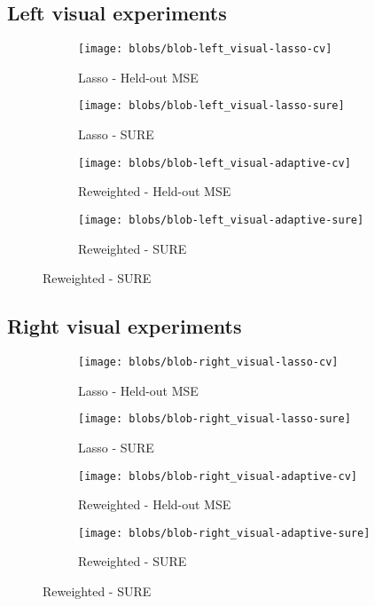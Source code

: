 \subsection{Left visual experiments}

\begin{figure}
    \centering
    \begin{subfigure}{6cm}
        \centering \texttt{[image: blobs/blob-left\_visual-lasso-cv]}
        \caption{Lasso - Held-out MSE}
    \end{subfigure}
    \begin{subfigure}{6cm}
        \centering \texttt{[image: blobs/blob-left\_visual-lasso-sure]}
        \caption{Lasso - SURE}
    \end{subfigure}

    \begin{subfigure}{6cm}
        \centering \texttt{[image: blobs/blob-left\_visual-adaptive-cv]}
        \caption{Reweighted - Held-out MSE}
    \end{subfigure}
    \begin{subfigure}{6cm}
        \centering \texttt{[image: blobs/blob-left\_visual-adaptive-sure]}
        \caption{Reweighted - SURE}
    \end{subfigure}
\end{figure}


\subsection{Right visual experiments}

\begin{figure}
    \centering
    \begin{subfigure}{6cm}
        \centering \texttt{[image: blobs/blob-right\_visual-lasso-cv]}
        \caption{Lasso - Held-out MSE}
    \end{subfigure}
    \begin{subfigure}{6cm}
        \centering \texttt{[image: blobs/blob-right\_visual-lasso-sure]}
        \caption{Lasso - SURE}
    \end{subfigure}

    \begin{subfigure}{6cm}
        \centering \texttt{[image: blobs/blob-right\_visual-adaptive-cv]}
        \caption{Reweighted - Held-out MSE}
    \end{subfigure}
    \begin{subfigure}{6cm}
        \centering \texttt{[image: blobs/blob-right\_visual-adaptive-sure]}
        \caption{Reweighted - SURE}
    \end{subfigure}
\end{figure}


